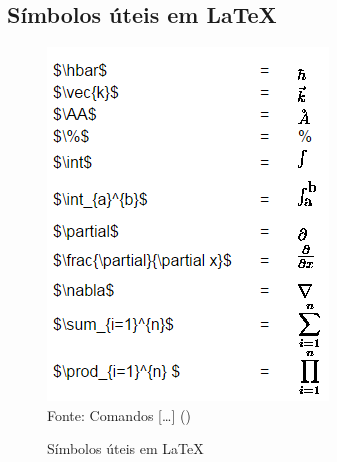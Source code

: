\begin{anexosenv}
\chapter{Símbolos úteis em \LaTeX}
\begin{figure}[H]
	\begin{center}
		\caption{\label{fig_anexoc}Símbolos úteis em \LaTeX}
		\includegraphics[scale=1.0]{USPSC-img/USPSC-SimbolosUteis.png} \\
		Fonte: Comandos [\ldots]  (\citeyear{comandos})
	\end{center}	
\end{figure}



\end{anexosenv}
